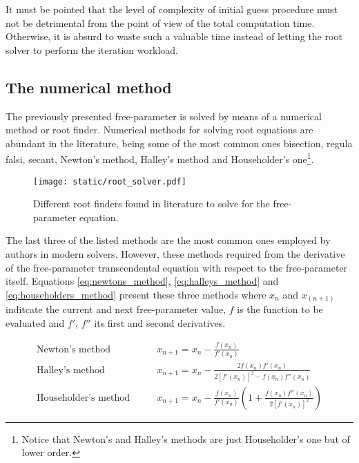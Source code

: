 It must be pointed that the level of complexity of initial guess procedure must
not be detrimental from the point of view of the total computation time.
Otherwise, it is absurd to waste such a valuable time instead of letting the
root solver to perform the iteration workload.

\subsection{The numerical method}
\label{sec:numerical_method}

The previously presented free-parameter is solved by means of a numerical method
or root finder. Numerical methods for solving root equations are abundant in the
literature, being some of the most common ones bisection, regula falsi, secant,
Newton's method, Halley's method and Householder's one\footnote{Notice that
  Newton's and Halley's methods are just Householder's one but of lower order.}.

\vspace{0.5cm}
\begin{figure}[h]
  \centering
  \texttt{[image: static/root\_solver.pdf]}
  \caption[Numerical methods and root solvers]{Different root finders found in literature to solve for the
    free-parameter equation.}
  \label{fig:numerical_method}
\end{figure}


The last three of the listed methods are the most common ones employed by
authors in modern solvers. However, these methods required from the derivative
of the free-parameter transcendental equation with respect to the free-parameter
itself. Equations \ref{eq:newtons_method}, \ref{eq:halleys_method} and
\ref{eq:householders_method} present these three methods where $x_n$ and
$x_(n+1)$ inditcate the current and next free-parameter value, $f$ is the
function to be evaluated and $f'$, $f''$ its first and second derivatives.

\begin{align}
  \text{Newton's method} \quad\quad      & x_{n+1} = x_{n} - \frac{f(x_n)}{f'(x_n)} \label{eq:newtons_method}                                                                       \\
  \text{Halley's method} \quad\quad      & x_{n+1} = x_{n} - \frac{2f(x_n)f'(x_n)}{2\left[f'(x_n)\right]^{2} - f(x_n)f''(x_n)} \label{eq:halleys_method}                            \\
  \text{Householder's method} \quad\quad & x_{n+1} = x_{n} - \frac{f(x_n)}{f'(x_n)}\left(1 + \frac{f(x_n)f''(x_n)}{2\left[f'(x_n)\right]^{2}}\right) \label{eq:householders_method}
\end{align}


